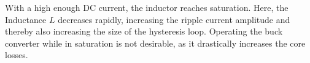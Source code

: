 With a high enough DC current, the inductor reaches saturation. Here, the Inductance $L$ decreases rapidly, increasing the ripple current amplitude and thereby also increasing the size of the hysteresis loop. Operating the buck converter while in saturation is not desirable, as it drastically increases the core losses.












